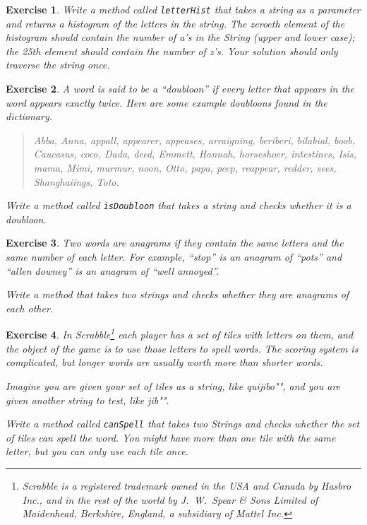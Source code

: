 \documentclass[12pt]{book}
\theoremstyle{exercise}
\newtheorem{exercise}{Exercise}[chapter]
\newcommand{\java}[1]{\verb"#1"}
\newcommand{\java}[1]{\lstinline{#1}} %
\begin{document}
\begin{exercise}
Write a method called \java{letterHist} that takes a string as a parameter and returns a histogram of the letters in the string.
The zeroeth element of the histogram should contain the number of a's in the String (upper and lower case); the 25th element should contain the number of z's.
Your solution should only traverse the string once.
\end{exercise}



\begin{exercise}
A word is said to be a ``doubloon'' if every letter that appears in the word appears exactly twice.
Here are some example doubloons found in the dictionary.

\begin{quote}
Abba, Anna, appall, appearer, appeases, arraigning, beriberi, bilabial, boob, Caucasus, coco, Dada, deed, Emmett, Hannah, horseshoer, intestines, Isis, mama, Mimi, murmur, noon, Otto, papa, peep, reappear, redder, sees, Shanghaiings, Toto.
\end{quote}

Write a method called \java{isDoubloon} that takes a string and checks whether it is a doubloon.
\end{exercise}


\begin{exercise}
Two words are anagrams if they contain the same letters and the same number of each letter.
For example, ``stop'' is an anagram of ``pots'' and ``allen downey'' is an anagram of ``well annoyed''.

Write a method that takes two strings and checks whether they are anagrams of each other.
\end{exercise}


\begin{exercise}
In Scrabble\footnote{Scrabble is a registered trademark owned in the USA and Canada by Hasbro Inc., and in the rest of the world by J.\ W.\ Spear \& Sons Limited of Maidenhead, Berkshire, England, a subsidiary of Mattel Inc.} each player has a set of tiles with letters on them, and the object of the game is to use those letters to spell words.
The scoring system is complicated, but longer words are usually worth more than shorter words.

Imagine you are given your set of tiles as a string, like \java{"quijibo"}, and you are given another string to test, like \java{"jib"}.

Write a method called \java{canSpell} that takes two Strings and checks whether the set of tiles can spell the word.
You might have more than one tile with the same letter, but you can only use each tile once.
\end{exercise}
\end{document}
